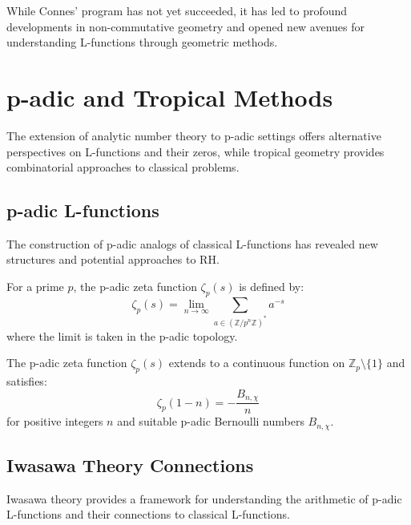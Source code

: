 \begin{remark}
While Connes' program has not yet succeeded, it has led to profound developments in non-commutative geometry and opened new avenues for understanding L-functions through geometric methods.
\end{remark}

\section{p-adic and Tropical Methods}
\label{sec:padic_tropical}

The extension of analytic number theory to p-adic settings offers alternative perspectives on L-functions and their zeros, while tropical geometry provides combinatorial approaches to classical problems.

\subsection{p-adic L-functions}

The construction of p-adic analogs of classical L-functions has revealed new structures and potential approaches to RH.

\begin{definition}
\label{def:padic_zeta}
For a prime $p$, the p-adic zeta function $\zeta_p(s)$ is defined by:
\begin{equation}
\zeta_p(s) = \lim_{n \to \infty} \sum_{a \in (\mathbb{Z}/p^n\mathbb{Z})^*} a^{-s}
\label{eq:padic_zeta}
\end{equation}
where the limit is taken in the p-adic topology.
\end{definition}

\begin{theorem}
\label{thm:kubota_leopoldt}
The p-adic zeta function $\zeta_p(s)$ extends to a continuous function on $\mathbb{Z}_p \setminus \{1\}$ and satisfies:
\begin{equation}
\zeta_p(1-n) = -\frac{B_{n,\chi}}{n}
\label{eq:kubota_leopoldt}
\end{equation}
for positive integers $n$ and suitable p-adic Bernoulli numbers $B_{n,\chi}$.
\end{theorem}

\subsection{Iwasawa Theory Connections}

Iwasawa theory provides a framework for understanding the arithmetic of p-adic L-functions and their connections to classical L-functions.

